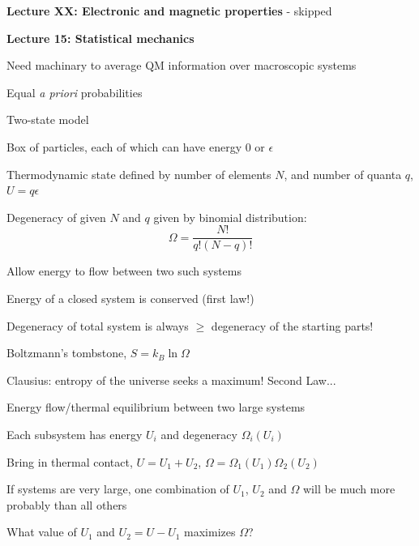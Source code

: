 \message{ !name(Outline.tex)}\documentclass[11pt]{article}
\begin{document}
\begin{outline}
\item {\bf Lecture XX: Electronic and magnetic properties} - skipped

\item {\bf Lecture 15: Statistical mechanics}
  \begin{outline}
    \item Need machinary to average QM information over macroscopic systems
    \item Equal {\em a priori} probabilities
    \item Two-state model
      \begin{outline}
      \item Box of particles, each of which can have energy 0 or $\epsilon$
      \item Thermodynamic state defined by number of elements $N$, and number of
        quanta $q$, $U=q\epsilon$
      \item Degeneracy of given $N$ and $q$ given by binomial distribution:
        \begin{displaymath}
          \Omega=\frac{N!}{q!(N-q)!}
        \end{displaymath}
      \item Allow energy to flow between two such systems
        \begin{outline}
        \item Energy of a closed system is conserved (first law!)
        \item Degeneracy of total system is always $\geq$ degeneracy of the
          starting parts!
        \item Boltzmann's tombstone, $S = k_B \ln \Omega$
        \item Clausius: entropy of the universe seeks a maximum!  Second Law...
        \end{outline}
      \end{outline}
      \item Energy flow/thermal equilibrium between two large systems
        \begin{outline}
          \item Each subsystem has energy $U_i$ and degeneracy $\Omega_i(U_i)$
          \item Bring in thermal contact, $U=U_1+U_2$, $\Omega=\Omega_1(U_1)\Omega_2(U_2)$
          \item If systems are very large, one combination of $U_1$, $U_2$ and $\Omega$
            will be much more probably than all others
          \item What value of $U_1$ and $U_2=U-U_1$ maximizes $\Omega$?

\end{outline}
\end{outline}
\end{outline}
\end{document}
